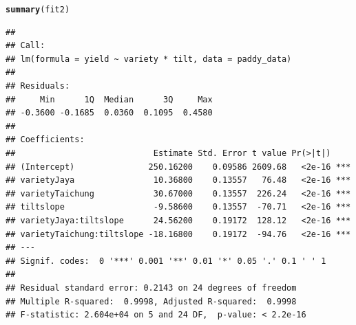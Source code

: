 \documentclass[11pt, a4paper]{article}\usepackage[]{graphicx}\usepackage[dvipsnames]{xcolor}
\makeatletter
\newcommand{\hlstd}[1]{\textcolor[rgb]{0.345,0.345,0.345}{#1}}%
\newcommand{\hlkwd}[1]{\textcolor[rgb]{0.737,0.353,0.396}{\textbf{#1}}}%
\newenvironment{kframe}{%
 \def\at@end@of@kframe{}%
 \ifinner\ifhmode%
  \def\at@end@of@kframe{\end{minipage}}%
  \begin{minipage}{\columnwidth}%
 \fi\fi%
 \def\FrameCommand##1{\hskip\@totalleftmargin \hskip-\fboxsep
 \colorbox{shadecolor}{##1}\hskip-\fboxsep
     \hskip-\linewidth \hskip-\@totalleftmargin \hskip\columnwidth}%
 \MakeFramed {\advance\hsize-\width
   \@totalleftmargin\z@ \linewidth\hsize
   \@setminipage}}%
 {\par\unskip\endMakeFramed%
 \at@end@of@kframe}
\newenvironment{knitrout}{}{} %
\makeatother
\begin{document}
\begin{knitrout}
\color{fgcolor}\begin{kframe}
\begin{alltt}
\hlkwd{summary}\hlstd{(fit2)}
\end{alltt}
\begin{verbatim}
## 
## Call:
## lm(formula = yield ~ variety * tilt, data = paddy_data)
## 
## Residuals:
##     Min      1Q  Median      3Q     Max 
## -0.3600 -0.1685  0.0360  0.1095  0.4580 
## 
## Coefficients:
##                            Estimate Std. Error t value Pr(>|t|)    
## (Intercept)               250.16200    0.09586 2609.68   <2e-16 ***
## varietyJaya                10.36800    0.13557   76.48   <2e-16 ***
## varietyTaichung            30.67000    0.13557  226.24   <2e-16 ***
## tiltslope                  -9.58600    0.13557  -70.71   <2e-16 ***
## varietyJaya:tiltslope      24.56200    0.19172  128.12   <2e-16 ***
## varietyTaichung:tiltslope -18.16800    0.19172  -94.76   <2e-16 ***
## ---
## Signif. codes:  0 '***' 0.001 '**' 0.01 '*' 0.05 '.' 0.1 ' ' 1
## 
## Residual standard error: 0.2143 on 24 degrees of freedom
## Multiple R-squared:  0.9998,	Adjusted R-squared:  0.9998 
## F-statistic: 2.604e+04 on 5 and 24 DF,  p-value: < 2.2e-16
\end{verbatim}
\end{kframe}
\end{knitrout}

\newpage
\end{document}

